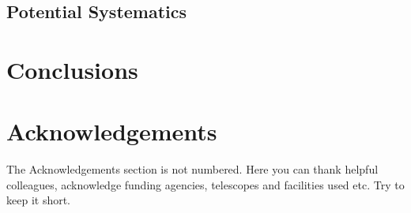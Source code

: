 \documentclass[fleqn,usenatbib]{mnras}
\newcommand{\mike}[1]{~\newline\noindent \textcolor{Green}{{ [Michael:~{#1}]\\}}}
\newcommand{\BGS}{\textsc{bgs}\xspace}
\newcommand{\GAMA}{\textsc{gama}\xspace}
\newcommand{\SDSS}{\textsc{sdss}\xspace}
\begin{document}
\subsection{Potential Systematics}

\section{Conclusions}

\section*{Acknowledgements}

The Acknowledgements section is not numbered. Here you can thank helpful
colleagues, acknowledge funding agencies, telescopes and facilities used etc.
Try to keep it short.

\end{document}
